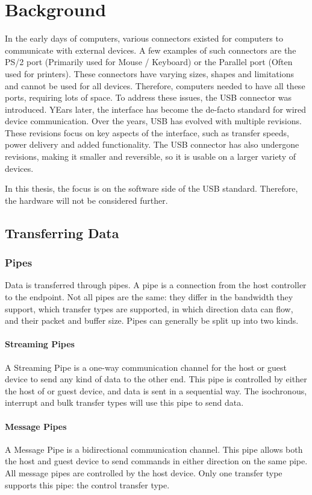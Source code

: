 \chapter{Background}
\label{chap:rel_work}
In the early days of computers, various connectors existed for computers to communicate with external devices. A few examples of such connectors are the PS/2 port (Primarily used for Mouse / Keyboard) or the Parallel port (Often used for printers). These connectors have varying sizes, shapes and limitations and cannot be used for all devices. Therefore, computers needed to have all these ports, requiring lots of space. To address these issues, the USB connector was introduced. YEars later, the interface has become the de-facto standard for wired device communication. Over the years, USB has evolved with multiple revisions. These revisions focus on key aspects of the interface, such as transfer speeds, power delivery and added functionality. The USB connector has also undergone revisions, making it smaller and reversible, so it is usable on a larger variety of devices.

In this thesis, the focus is on the software side of the USB standard. Therefore, the hardware will not be considered further.

\section{Transferring Data \cite{USB_in_a_NutShell}}
\subsection{Pipes}
Data is transferred through pipes. A pipe is a connection from the host controller to the endpoint. Not all pipes are the same: they differ in the bandwidth they support, which transfer types are supported, in which direction data can flow, and their packet and buffer size. Pipes can generally be split up into two kinds.

\subsubsection{Streaming Pipes}
A Streaming Pipe is a one-way communication channel for the host or guest device to send any kind of data to the other end. This pipe is controlled by either the host of or guest device, and data is sent in a sequential way. The isochronous, interrupt and bulk transfer types will use this pipe to send data.

\subsubsection{Message Pipes}
A Message Pipe is a bidirectional communication channel. This pipe allows both the host and guest device to send commands in either direction on the same pipe. All message pipes are controlled by the host device. Only one transfer type supports this pipe: the control transfer type.

